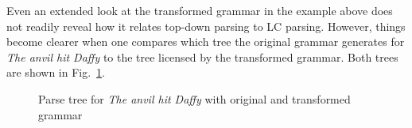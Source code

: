Even an extended look at the transformed grammar in the example above does not readily reveal how it relates top-down parsing to LC parsing.
However, things become clearer when one compares which tree the original grammar generates for \emph{The anvil hit Daffy} to the tree licensed by the transformed grammar.
Both trees are shown in Fig.~\ref{fig:LC_TransformTreeComparison}.
%
\begin{figure}[tbph]
\centering
    \hspace{2em}
\caption{Parse tree for \emph{The anvil hit Daffy} with original and transformed grammar}
\label{fig:LC_TransformTreeComparison}
\end{figure}
